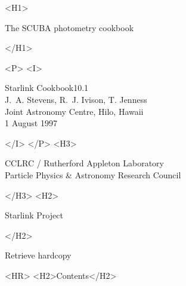 \documentclass[twoside,11pt,fleqn]{article}
\newcommand{\stardoccategory}  {Starlink Cookbook}
\newcommand{\stardocsource}    {sc\stardocnumber}
\newcommand{\stardocnumber}    {10.1}
\newcommand{\stardocauthors}   {J.~A. Stevens, R.~J. Ivison, T. Jenness\\
                                Joint Astronomy Centre, Hilo, Hawaii}
\newcommand{\stardocdate}      {1 August 1997}
\newcommand{\stardoctitle}     {The SCUBA photometry cookbook}
\newcommand{\stardocversion}   {\ }
\newcommand{\stardocmanual}    {\ }
\newcommand{\htmladdnormallink}[2]{#1}
\newcommand{\htmladdimg}[1]{}
\newcommand{\htmlref}[2]{#1}
\newcommand{\htmladdtonavigation}[1]{}
\newcommand{\xlabel}[1]{}
\newcommand{\latexonlytoc}[0]{\tableofcontents}
\begin{document}
\begin{htmlonly}
   \xlabel{}
   \begin{rawhtml} <H1> \end{rawhtml}
      \stardoctitle\\
   \begin{rawhtml} </H1> \end{rawhtml}
 
 
   \begin{rawhtml} <P> <I> \end{rawhtml}
   \stardoccategory \stardocnumber \\
   \stardocauthors \\
   \stardocdate
   \begin{rawhtml} </I> </P> <H3> \end{rawhtml}
      \htmladdnormallink{CCLRC}{http://www.cclrc.ac.uk} /
      \htmladdnormallink{Rutherford Appleton Laboratory}
                        {http://www.cclrc.ac.uk/ral} \\
      \htmladdnormallink{Particle Physics \& Astronomy Research Council}
                        {http://www.pparc.ac.uk} \\
   \begin{rawhtml} </H3> <H2> \end{rawhtml}
      \htmladdnormallink{Starlink Project}{http://star-www.rl.ac.uk/}
   \begin{rawhtml} </H2> \end{rawhtml}
   \htmladdnormallink{\htmladdimg{source.gif} Retrieve hardcopy}
      {http://star-www.rl.ac.uk/cgi-bin/hcserver?\stardocsource}\\
 
  \label{stardoccontents}
  \begin{rawhtml} 
    <HR>
    <H2>Contents</H2>
  \end{rawhtml}
  \renewcommand{\latexonlytoc}[0]{}
  \htmladdtonavigation{\htmlref{\htmladdimg{contents_motif.gif}}
        {stardoccontents}}
 
\end{htmlonly}
 
\end{document}
